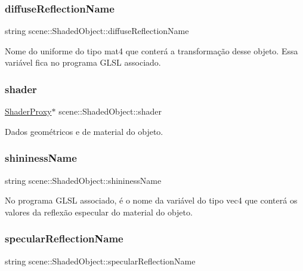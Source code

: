 \subsubsection{\texorpdfstring{diffuse\+Reflection\+Name}{diffuseReflectionName}}
{\footnotesize\ttfamily string scene\+::\+Shaded\+Object\+::diffuse\+Reflection\+Name}

Nome do uniforme do tipo mat4 que conterá a transformação desse objeto. Essa variável fica no programa G\+L\+SL associado. \mbox{\label{classscene_1_1_shaded_object_a4a7b0d0844a6fd186fff1b58c97adbfe}} 
\subsubsection{\texorpdfstring{shader}{shader}}
{\footnotesize\ttfamily \mbox{\hyperlink{classshaderutils_1_1_shader_proxy}{Shader\+Proxy}}$\ast$ scene\+::\+Shaded\+Object\+::shader}

Dados geométricos e de material do objeto. \mbox{\label{classscene_1_1_shaded_object_a15626025c84615d9b67fb40a13496217}} 
\subsubsection{\texorpdfstring{shininess\+Name}{shininessName}}
{\footnotesize\ttfamily string scene\+::\+Shaded\+Object\+::shininess\+Name}

No programa G\+L\+SL associado, é o nome da variável do tipo vec4 que conterá os valores da reflexão especular do material do objeto. \mbox{\label{classscene_1_1_shaded_object_a957ab48c3aaa1474bac1903c19c54af8}} 
\subsubsection{\texorpdfstring{specular\+Reflection\+Name}{specularReflectionName}}
{\footnotesize\ttfamily string scene\+::\+Shaded\+Object\+::specular\+Reflection\+Name}

